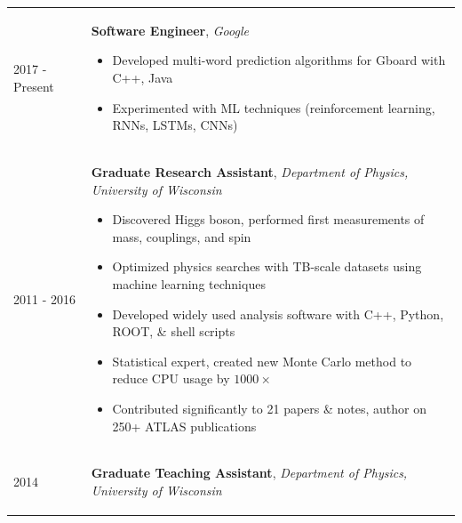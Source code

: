 \documentclass{letter}
\begin{document}
\begin{tabular}{p{}p{}}
        2017 - Present
        &
        \textbf{Software Engineer}, \textit{Google} \newline
	\vspace{-15pt}      %
        \begin{itemize}
		\itemsep0em
		\renewcommand{\labelitemi}{\tiny$\blacksquare$}
    		\item Developed multi-word prediction algorithms for Gboard with C++, Java
                \item Experimented with ML techniques (reinforcement learning, RNNs, LSTMs, CNNs)
        \end{itemize}
\\
	2011 - 2016
	&
	\textbf{Graduate Research Assistant}, \textit{Department of Physics, University of Wisconsin} \newline
	\vspace{-15pt}      %
	\begin{itemize}
		\itemsep0em
		\renewcommand{\labelitemi}{\tiny$\blacksquare$}
    		\item Discovered Higgs boson, performed first measurements of mass, couplings, and spin 
		\item Optimized physics searches with TB-scale datasets using machine learning techniques
    		\item Developed widely used analysis software with C++, Python, ROOT, \& shell scripts
    		\item Statistical expert, created new Monte Carlo method to reduce CPU usage by $1000\times$
		\item Contributed significantly to 21 papers \& notes, author on 250+ ATLAS publications
	\end{itemize}
\\
	2014 
	& 
	\textbf{Graduate Teaching Assistant}, \textit{Department of Physics, University of Wisconsin} \newline
	\vspace{-15pt}      %
	\begin{itemize}

\end{itemize}
\end{tabular}
\end{document}
